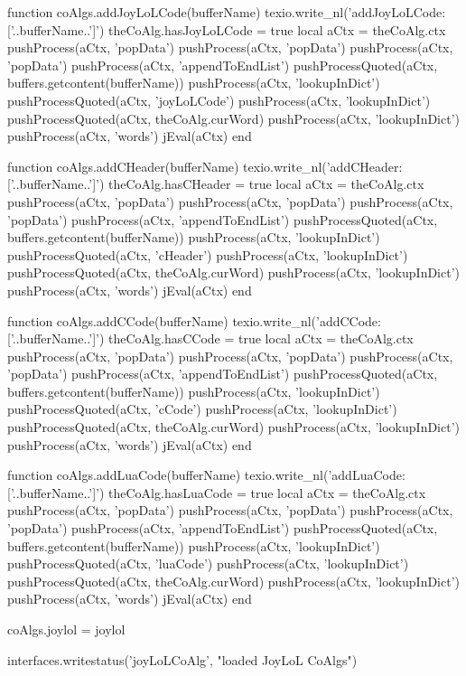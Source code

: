 function coAlgs.addJoyLoLCode(bufferName)
  texio.write_nl('addJoyLoLCode: ['..bufferName..']')
  theCoAlg.hasJoyLoLCode = true
  local aCtx = theCoAlg.ctx
  pushProcess(aCtx, 'popData')
  pushProcess(aCtx, 'popData')
  pushProcess(aCtx, 'popData')
  pushProcess(aCtx, 'appendToEndList')
  pushProcessQuoted(aCtx, buffers.getcontent(bufferName))
  pushProcess(aCtx, 'lookupInDict')
  pushProcessQuoted(aCtx, 'joyLoLCode')
  pushProcess(aCtx, 'lookupInDict')
  pushProcessQuoted(aCtx, theCoAlg.curWord)
  pushProcess(aCtx, 'lookupInDict')
  pushProcess(aCtx, 'words')
  jEval(aCtx)
end

function coAlgs.addCHeader(bufferName)
  texio.write_nl('addCHeader: ['..bufferName..']')
  theCoAlg.hasCHeader = true
  local aCtx = theCoAlg.ctx
  pushProcess(aCtx, 'popData')
  pushProcess(aCtx, 'popData')
  pushProcess(aCtx, 'popData')
  pushProcess(aCtx, 'appendToEndList')
  pushProcessQuoted(aCtx, buffers.getcontent(bufferName))
  pushProcess(aCtx, 'lookupInDict')
  pushProcessQuoted(aCtx, 'cHeader')
  pushProcess(aCtx, 'lookupInDict')
  pushProcessQuoted(aCtx, theCoAlg.curWord)
  pushProcess(aCtx, 'lookupInDict')
  pushProcess(aCtx, 'words')
  jEval(aCtx)
end

function coAlgs.addCCode(bufferName)
  texio.write_nl('addCCode: ['..bufferName..']')
  theCoAlg.hasCCode = true
  local aCtx = theCoAlg.ctx
  pushProcess(aCtx, 'popData')
  pushProcess(aCtx, 'popData')
  pushProcess(aCtx, 'popData')
  pushProcess(aCtx, 'appendToEndList')
  pushProcessQuoted(aCtx, buffers.getcontent(bufferName))
  pushProcess(aCtx, 'lookupInDict')
  pushProcessQuoted(aCtx, 'cCode')
  pushProcess(aCtx, 'lookupInDict')
  pushProcessQuoted(aCtx, theCoAlg.curWord)
  pushProcess(aCtx, 'lookupInDict')
  pushProcess(aCtx, 'words')
  jEval(aCtx)
end

function coAlgs.addLuaCode(bufferName)
  texio.write_nl('addLuaCode: ['..bufferName..']')
  theCoAlg.hasLuaCode = true
  local aCtx = theCoAlg.ctx
  pushProcess(aCtx, 'popData')
  pushProcess(aCtx, 'popData')
  pushProcess(aCtx, 'popData')
  pushProcess(aCtx, 'appendToEndList')
  pushProcessQuoted(aCtx, buffers.getcontent(bufferName))
  pushProcess(aCtx, 'lookupInDict')
  pushProcessQuoted(aCtx, 'luaCode')
  pushProcess(aCtx, 'lookupInDict')
  pushProcessQuoted(aCtx, theCoAlg.curWord)
  pushProcess(aCtx, 'lookupInDict')
  pushProcess(aCtx, 'words')
  jEval(aCtx)
end

coAlgs.joylol = joylol

interfaces.writestatus('joyLoLCoAlg', "loaded JoyLoL CoAlgs")
\stopLuaCode

